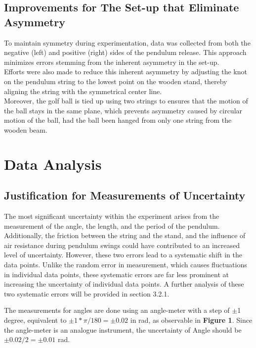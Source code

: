 \documentclass{article}
\begin{document}
\subsection{Improvements for The Set-up that Eliminate Asymmetry}


To maintain symmetry during experimentation, data was collected from both the negative (left) and positive (right) sides of the pendulum release. This approach minimizes errors stemming from the inherent asymmetry in the set-up. \\
\indent Efforts were also made to reduce this inherent asymmetry by adjusting the knot on the pendulum string to the lowest point on the wooden stand, thereby aligning the string with the symmetrical center line. \\
\indent Moreover, the golf ball is tied up using two strings to ensures that the motion of the ball stays in the same plane, which prevents asymmetry caused by circular motion of the ball, had the ball been hanged from only one string from the wooden beam.

\section{Data Analysis}

\subsection{Justification for Measurements of Uncertainty}

The most significant uncertainty within the experiment arises from the measurement of the angle, the length, and the period of the pendulum. Additionally, the friction between the string and the stand, and the influence of air resistance during pendulum swings could have contributed to an increased level of uncertainty. However, these two errors lead to a systematic shift in the data points. Unlike the random error in measurement, which causes fluctuations in individual data points, these systematic errors are far less prominent at increasing the uncertainty of individual data points. A further analysis of these two systematic errors will be provided in section 3.2.1.

The measurements for angles are done using an angle-meter with a step of $\pm$1 degree, equivalent to $\pm 1*\pi/180= \pm0.02$ in rad, as observable in \textbf{Figure 1}. Since the angle-meter is an analogue instrument, the uncertainty of Angle should be $\pm 0.02/2= \pm0.01$ rad.
\end{document}
